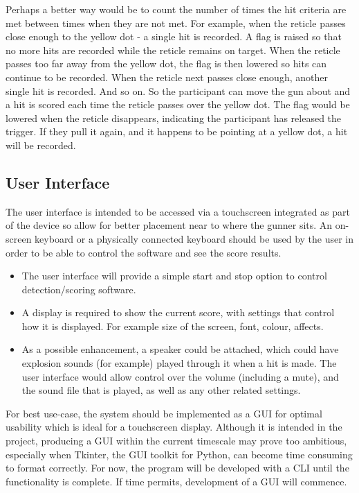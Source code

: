 \documentclass[final]{cmpreport_02}
\begin{document}
Perhaps a better way would be to count the number of times the hit criteria are met between times when they are not met. For example, when the reticle passes close enough to the yellow dot - a single hit is recorded. A flag is raised so that no more hits are recorded while the reticle remains on target. When the reticle passes too far away from the yellow dot, the flag is then lowered so hits can continue to be recorded. When the reticle next passes close enough, another single hit is recorded. And so on. So the participant can move the gun about and a hit is scored each time the reticle passes over the yellow dot. The flag would be lowered when the reticle disappears, indicating the participant has released the trigger. If they pull it again, and it happens to be pointing at a yellow dot, a hit will be recorded.

\subsection{User Interface}

The user interface is intended to be accessed via a touchscreen integrated as part of the device so allow for better placement near to where the gunner sits. An on-screen keyboard or a physically connected keyboard should be used by the user in order to be able to control the software and see the score results.
\begin{itemize}
	\item The user interface will provide a simple start and stop option to control detection/scoring software.
	\item A display is required to show the current score, with settings that control how it is displayed. For example size of the screen, font, colour, affects.
	\item As a possible enhancement, a speaker could be attached, which could have explosion sounds (for example) played through it when a hit is made. The user interface would allow control over the volume (including a mute), and the sound file that is played, as well as any other related settings.
\end{itemize}
\noindent
For best use-case, the system should be implemented as a GUI for optimal usability which is ideal for a touchscreen display. Although it is intended in the project, producing a GUI within the current timescale may prove too ambitious, especially when Tkinter, the GUI toolkit for Python, can become time consuming to format correctly. For now, the program will be developed with a CLI until the functionality is complete. If time permits, development of a GUI will commence.
\end{document}
